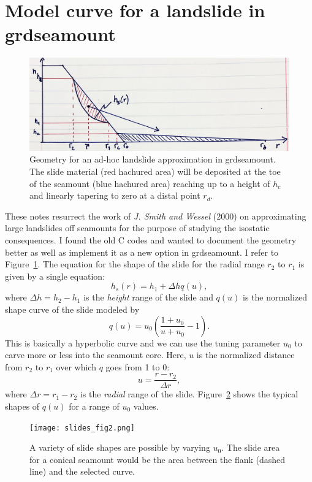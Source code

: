 \documentclass[12pt,letterpaper,margin=0.5in]{report}
\begin{document}
\section{Model curve for a landslide in grdseamount}

\begin{figure}[h!]
  \centering
  \includegraphics[width=\textwidth]{slides_fig1.png}
  \caption{Geometry for an ad-hoc landslide approximation in grdseamount.  The slide material (red hachured area)
  will be deposited at the toe of the seamount (blue hachured area) reaching up to a height of $h_c$ and linearly
  tapering to zero at a distal point $r_d$.}
  \label{slides_fig1}
\end{figure}

These notes resurrect the work of {\it J. Smith and Wessel} (2000) on approximating large landslides off seamounts
for the purpose of studying the isostatic consequences.  I found the old C codes and wanted to document the geometry
better as well as implement it as a new option in grdseamount.  I refer to Figure~\ref{slides_fig1}.  The equation for the
shape of the slide for the radial range $r_2$ to $r_1$ is given by a single equation:
\begin{equation}
h_s(r) = h_1 + \Delta h q(u),
\end{equation}
where $\Delta h = h_2 - h_1$ is the \emph{height} range of the slide and $q(u)$ is the normalized shape curve of the slide
modeled by
\begin{equation}
q(u) = u_0 \left (\frac{1 + u_0}{u + u_0} - 1 \right ).
\end{equation}
This is basically a hyperbolic curve and we can use the tuning parameter $u_0$ to carve more or less into the seamount core.
Here, $u$ is the normalized distance from $r_2$ to $r_1$ over which $q$ goes from 1 to 0:
\begin{equation}
u = \frac{r-r_2}{\Delta r},
\end{equation}
where $\Delta r = r_1 - r_2$ is the \emph{radial} range of the slide.
Figure~\ref{slides_fig2} shows the typical shapes of $q(u)$ for a range of $u_0$ values.
\begin{figure}[h!]
  \centering
  \texttt{[image: slides\_fig2.png]}
  \caption{A variety of slide shapes are possible by varying $u_0$.  The slide area for a conical seamount would be the area
  between the flank (dashed line) and the selected curve.}
  \label{slides_fig2}
\end{figure}
\end{document}
